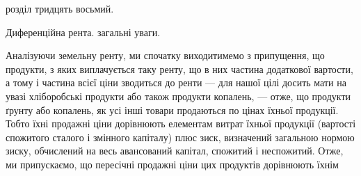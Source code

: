 розділ тридцять восьмий.

Диференційна рента. загальні уваги.

Аналізуючи земельну ренту, ми спочатку виходитимемо з припущення, що
продукти, з яких виплачується таку ренту, що в них частина додаткової вартости,
а тому і частина всієї ціни зводиться до ренти — для нашої цілі досить мати на
увазі хліборобські продукти або також продукти копалень, — отже, що продукти
ґрунту або копалень, як усі інші товари продаються по цінах їхньої продукції.
Тобто їхні продажні ціни дорівнюють елементам витрат їхньої продукції (вартості
спожитого сталого і змінного капіталу) плюс зиск, визначений загальною
нормою зиску, обчислений на весь авансований капітал, спожитий і неспожитий.
Отже, ми припускаємо, що пересічні продажні ціни цих продуктів дорівнюють їхнім
\parbreak{}  %
